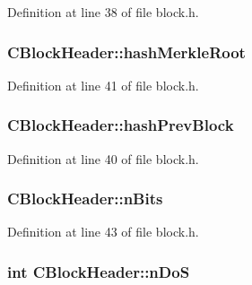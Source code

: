 Definition at line 38 of file block.\+h.

\hypertarget{class_c_block_header_ae9ef013abbcfbd9f8bc23dbcda0fd5af}{}
\subsubsection[{hash\+Merkle\+Root}]{ C\+Block\+Header\+::hash\+Merkle\+Root}\label{class_c_block_header_ae9ef013abbcfbd9f8bc23dbcda0fd5af}


Definition at line 41 of file block.\+h.

\hypertarget{class_c_block_header_ad9b904df502d648309342e5e5b0949a6}{}
\subsubsection[{hash\+Prev\+Block}]{ C\+Block\+Header\+::hash\+Prev\+Block}\label{class_c_block_header_ad9b904df502d648309342e5e5b0949a6}


Definition at line 40 of file block.\+h.

\hypertarget{class_c_block_header_a88d501b1da4d34d7dc80c65bd4837670}{}
\subsubsection[{n\+Bits}]{ C\+Block\+Header\+::n\+Bits}\label{class_c_block_header_a88d501b1da4d34d7dc80c65bd4837670}


Definition at line 43 of file block.\+h.

\hypertarget{class_c_block_header_af07deb221708fa7a992e65ec20d13534}{}
\subsubsection[{n\+Do\+S}]{\setlength{\rightskip}{0pt plus 5cm}int C\+Block\+Header\+::n\+Do\+S\hspace{0.3cm}{\ttfamily [mutable]}}\label{class_c_block_header_af07deb221708fa7a992e65ec20d13534}


